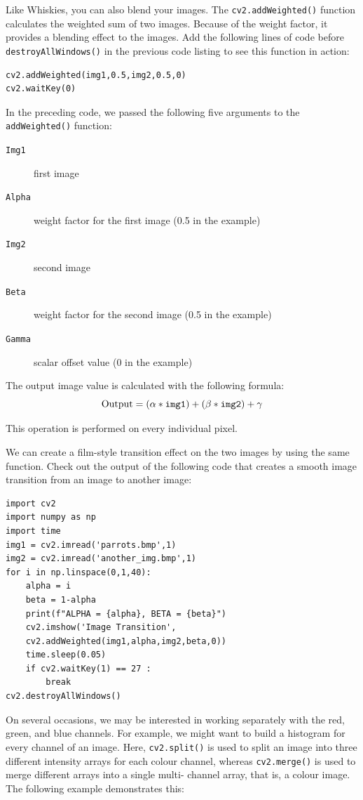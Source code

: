 \documentclass{labo}
\begin{document}
Like Whiskies, you can also blend your images. The \texttt{cv2.addWeighted()} function calculates the weighted sum of two images. Because of the weight factor, it provides a blending effect to the images. Add the following lines of code before \texttt{destroyAllWindows()} in the previous code listing to see this function in action:

\begin{verbatim}
cv2.addWeighted(img1,0.5,img2,0.5,0)
cv2.waitKey(0)
\end{verbatim}
In the preceding code, we passed the following five arguments to the \texttt{addWeighted()} function:
\begin{description}
	\item[\texttt{Img1}] first image
	\item[\texttt{Alpha}]  weight factor for the first image (0.5 in the example)
	\item[\texttt{Img2}]  second image
	\item[\texttt{Beta}] weight factor for the second image (0.5 in the example)
	\item[\texttt{Gamma}]  scalar offset value (0 in the example)
\end{description}

The output image value is calculated with the following formula:
\[\text{Output}=(\alpha*\text{\texttt{img1}})+(\beta*\text{\texttt{img2}})+\gamma\]

This operation is performed on every individual pixel.

We can create a film-style transition effect on the two images by using the same function. Check out the output of the following code that creates a smooth image transition from an image to another image:

\begin{verbatim}
import cv2
import numpy as np
import time
img1 = cv2.imread('parrots.bmp',1)
img2 = cv2.imread('another_img.bmp',1)
for i in np.linspace(0,1,40):
	alpha = i
	beta = 1-alpha
	print(f"ALPHA = {alpha}, BETA = {beta}")
	cv2.imshow('Image Transition',
	cv2.addWeighted(img1,alpha,img2,beta,0))
	time.sleep(0.05)
	if cv2.waitKey(1) == 27 :
		break
cv2.destroyAllWindows()
\end{verbatim}

On several occasions, we may be interested in working separately with the red, green, and blue channels. For example, we might want to build a histogram for every channel of an image. Here, \texttt{cv2.split()} is used to split an image into three different intensity arrays for each colour channel, whereas \texttt{cv2.merge()} is used to merge different arrays into a single multi- channel array, that is, a colour image. The following example demonstrates this:
\end{document}
